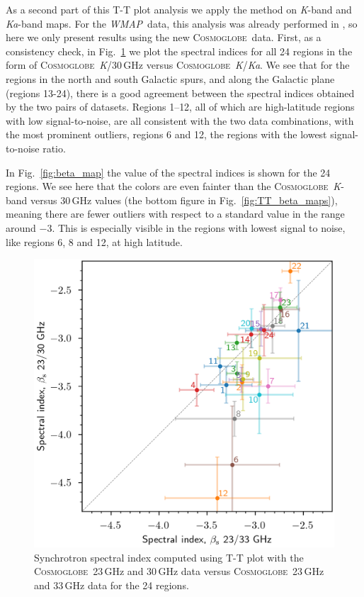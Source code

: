 \documentclass[twocolumn]{../../common/aa}
\def\wmap{\emph{WMAP}}
\newcommand{\cosmoglobe}{\textsc{Cosmoglobe}}
\newcommand{\Cosmoglobe}{\textsc{Cosmoglobe}}
\newcommand{\K}[0]{\textit K}
\newcommand{\Ka}[0]{\textit{Ka}}
\begin{document}
As a second part of this T-T plot analysis we apply the method on \K-band and \Ka-band maps. For the \wmap\ data, this analysis was already performed in  \citet{fuskeland2014}, so here we only present results using the new \cosmoglobe\ data. First, as a consistency check, in Fig.~\ref{fig:cos30_xyplot} we plot the spectral indices for all 24 regions in the form of \cosmoglobe\ \K/30\,GHz versus \cosmoglobe\ \K/\Ka. We see that for the regions in the north and south Galactic spurs, and along the Galactic plane (regions 13-24), there is a good agreement between the spectral indices obtained by the two pairs of datasets. Regions 1--12, all of which are high-latitude regions with low signal-to-noise, are all consistent with the two data combinations, with the most prominent outliers, regions 6 and 12, the regions with the lowest signal-to-noise ratio.

In Fig.~\ref{fig:beta_map} the value of the spectral indices is shown for the 24 regions. We see here that the colors are even fainter than the \cosmoglobe\ \K-band versus 30\,GHz values (the bottom figure in Fig.~\ref{fig:TT_beta_maps}), meaning there are fewer outliers with respect to a standard value in the range around $-3$. This is especially visible in the regions with lowest signal to noise, like regions 6, 8 and 12, at high latitude.


\begin{figure}
        \centering
        \includegraphics[width=\linewidth]{figures/xy_regions.png}
        \caption{
Synchrotron spectral index computed using T-T plot with the \Cosmoglobe\ 23\,GHz and 30\,GHz data versus \Cosmoglobe\ 23\,GHz and 33\,GHz data for the 24 regions.}
        \label{fig:cos30_xyplot}
\end{figure}
\end{document}

